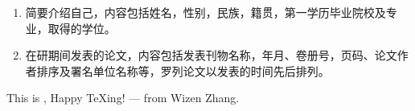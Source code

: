 \biography
\thispagestyle{fancy}%
\begin{enumerate}[label=\arabic*)]
	\item 简要介绍自己，内容包括姓名，性别，民族，籍贯，第一学历毕业院校及专业，取得的学位。
	
	\item 在研期间发表的论文，内容包括发表刊物名称，年月、卷册号，页码、论文作者排序及署名单位名称等，罗列论文以发表的时间先后排列。
\end{enumerate}

\vspace{5cm}

This is \NMUThesis{}, Happy TeXing! --- from Wizen Zhang.